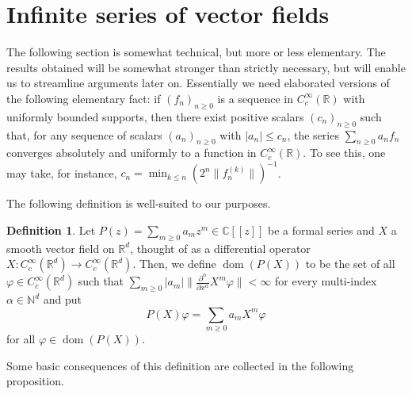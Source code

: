\documentclass[12pt]{article}
\theoremstyle{plain}
\theoremstyle{definition}
\newtheorem{defn}[thm]{Definition}
\newcommand{\R}{\mathbb{R}}
\newcommand{\C}{\mathbb{C}}
\newcommand{\N}{\mathbb{N}}
\newcommand{\dom}{\operatorname{dom}}
\numberwithin{equation}{section}
\begin{document}
\section{Infinite series of vector fields}









The following section is somewhat technical, but more or less elementary. The results obtained will be somewhat stronger than strictly  necessary, but will enable us to streamline arguments later on. Essentially we need elaborated versions of the following elementary fact: if $(f_n)_{n \geq 0}$ is a sequence in $C_c^\infty(\R)$ with uniformly bounded supports, then there exist positive scalars $(c_n)_{n \geq 0}$ such that, for any sequence of scalars $(a_n)_{n \geq 0}$ with $|a_n| \leq c_n$, the series $\sum_{n \geq 0} a_n f_n$ converges absolutely and uniformly  to a function in $C_c^\infty(\R)$. To see this, one may take, for instance, $c_n = \min_{k \leq n} \left( 2^n \|f^{(k)}_n\|\right)^{-1}$. 

The following definition is well-suited to our purposes.



\begin{defn}
Let $P(z) = \sum_{m \geq 0} a_m z^m \in \C[[z]]$ be a formal series and $X$ a smooth vector field  on $\R^d$, thought of as a differential operator $X : C_c^\infty(\R^d) \to C_c^\infty(\R^d)$. Then, we define $\dom(P(X))$ to be the set of all $\varphi \in C_c^\infty(\R^d)$ such that $\sum_{m \geq 0} |a_m| \| \tfrac{\partial^\alpha}{\partial x^\alpha} X^m \varphi \|< \infty$ for every multi-index $\alpha \in \N^d$ and put 
\[ P(X) \varphi = \sum_{m \geq 0} a_m X^m \varphi \]
for all $\varphi \in \dom(P(X))$.
\end{defn}


Some basic  consequences of this definition are collected in the following proposition.
\end{document}
